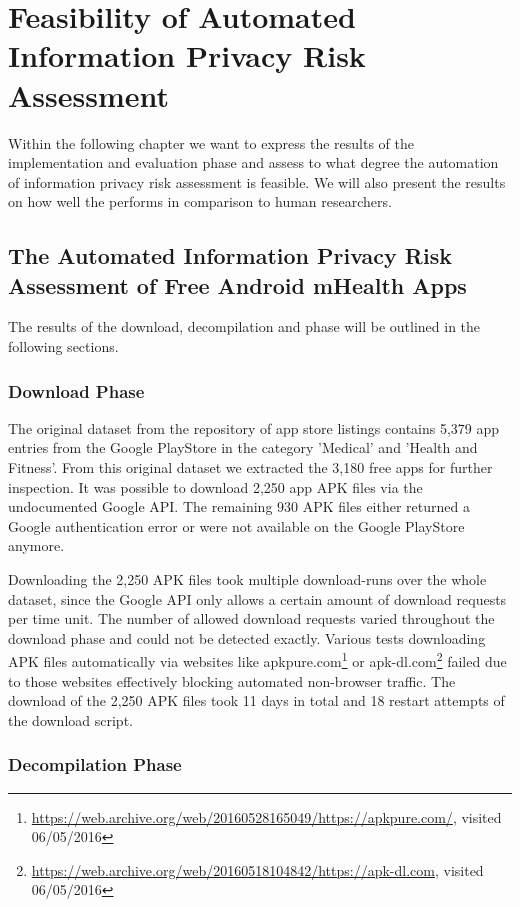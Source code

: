 \section{Feasibility of Automated Information Privacy Risk Assessment}

Within the following chapter we want to express the results of the implementation and evaluation phase and assess to what degree the automation of information privacy risk assessment is feasible.
We will also present the results on how well the \aiprat performs in comparison to human researchers.

\subsection{The Automated Information Privacy Risk Assessment of Free Android mHealth Apps}

The results of the download, decompilation and \sca phase will be outlined in the following sections.

\subsubsection{Download Phase}

The original dataset from the \cite{Xu2015} repository of app store listings contains 5,379 app entries from the Google PlayStore in the category 'Medical' and 'Health and Fitness'.
From this original dataset we extracted the 3,180 free apps for further inspection.
It was possible to download 2,250 app APK files via the undocumented Google API.
The remaining 930 APK files either returned a Google authentication error or were not available on the Google PlayStore anymore.

Downloading the 2,250 APK files took multiple download-runs over the whole dataset, since the Google API only allows a certain amount of download requests per time unit.
The number of allowed download requests varied throughout the download phase and could not be detected exactly.
Various tests downloading APK files automatically via websites like apkpure.com\footnote{\url{https://web.archive.org/web/20160528165049/https://apkpure.com/}, visited 06/05/2016} or apk-dl.com\footnote{\url{https://web.archive.org/web/20160518104842/https://apk-dl.com}, visited 06/05/2016} failed due to those websites effectively blocking automated non-browser traffic.
The download of the 2,250 APK files took 11 days in total and 18 restart attempts of the download script.

\subsubsection{Decompilation Phase}


